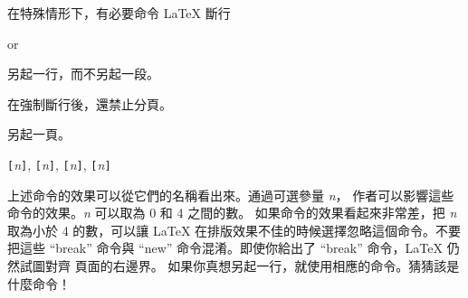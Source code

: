在特殊情形下，有必要命令 \LaTeX{} 斷行
\begin{lscommand}
\ci{\bs} or 
\end{lscommand}
\noindent 另起一行，而不另起一段。

\begin{lscommand}
\ci{\bs*}
\end{lscommand}
\noindent 在強制斷行後，還禁止分頁。

\begin{lscommand}
\end{lscommand}
\noindent 另起一頁。

\begin{lscommand}
\verb|[|\emph{n}\verb|]|,
\verb|[|\emph{n}\verb|]|,
\verb|[|\emph{n}\verb|]|,
\verb|[|\emph{n}\verb|]|
\end{lscommand}
\noindent
上述命令的效果可以從它們的名稱看出來。通過可選參量 \emph{n}，
作者可以影響這些命令的效果。\emph{n} 可以取為 0 和 4 之間的數。
如果命令的效果看起來非常差，把 \emph{n} 取為小於 4 的數，可以讓
 \LaTeX{} 在排版效果不佳的時候選擇忽略這個命令。不要把這些 ``break''  命令與 ``new'' 
命令混淆。即使你給出了 ``break'' 命令，\LaTeX{} 仍然試圖對齊
頁面的右邊界。
如果你真想另起一行，就使用相應的命令。猜猜該是什麼命令！


